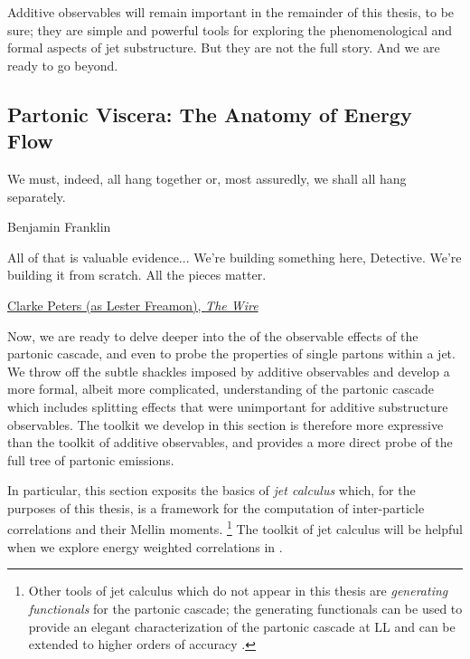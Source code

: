 Additive observables will remain important in the remainder of this thesis, to be sure;
%
they are simple and powerful tools for exploring the phenomenological and formal aspects of jet substructure.
%
But they are not the full story.
%
And we are ready to go beyond.




\subsection{Partonic Viscera: The Anatomy of Energy Flow}
\label{sec:p2p-fragmentation}

\epigraph{We must, indeed, all hang together or, most assuredly, we shall all hang separately.}{Benjamin Franklin}

\epigraph{All of that is valuable evidence... We're building something here, Detective. We're building it from scratch. All the pieces matter.}{\href{https://youtu.be/lgRxFFmr538?t=18}{Clarke Peters (as Lester Freamon), \textit{The Wire}}}



Now, we are ready to delve deeper into the of the observable effects of the partonic cascade, and even to probe the properties of single partons within a jet.
%
We throw off the subtle shackles imposed by additive observables and develop a more formal, albeit more complicated, understanding of the partonic cascade which includes splitting effects that were unimportant for additive substructure observables.
%
The toolkit we develop in this section is therefore more expressive than the toolkit of additive observables, and provides a more direct probe of the full tree of partonic emissions.


In particular, this section exposits the basics of \textit{jet calculus} \cite{Konishi:1978dg,Konishi:1978yx,Konishi:1978ks} which, for the purposes of this thesis, is a framework for the computation of inter-particle correlations and their Mellin moments.%
\footnote{
    Other tools of jet calculus which do not appear in this thesis are \textit{generating functionals} for the partonic cascade;
    the generating functionals can be used to provide an elegant characterization of the partonic cascade at LL and can be extended to higher orders of accuracy \cite{vanBeekveld:2023lsa}.
}
%
The toolkit of jet calculus will be helpful when we explore energy weighted correlations in .



